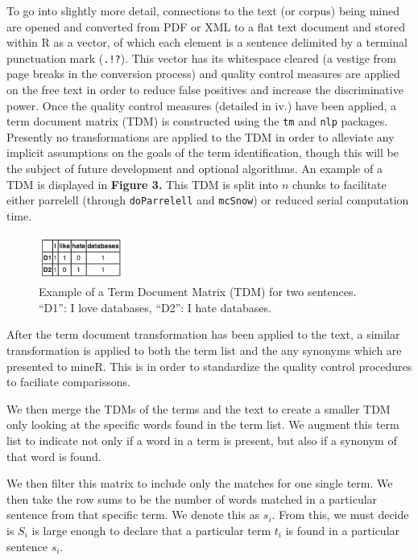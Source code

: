 \documentclass[twoside]{article}
\begin{document}
To go into slightly more detail, connections to the text (or corpus) being mined are opened and converted from PDF or XML to a flat text document and stored within R as a vector, of which each element is a sentence delimited by a terminal punctuation mark (\texttt{.!?}).  This vector has its whitespace cleared (a vestige from page breaks in the conversion process) and quality control measures are applied on the free text in order to reduce false positives and increase the discriminative power. Once the quality control measures (detailed in iv.) have been applied, a term document matrix (TDM) is constructed using the \texttt{tm} and \texttt{nlp} packages. Presently no transformations are applied to the TDM in order to alleviate any implicit assumptions on the goals of the term identification, though this will be the subject of future development and optional algorithms. An example of a TDM is displayed in \textbf{Figure 3.} This TDM is split into $n$ chunks to facilitate either parrelell (through \texttt{doParrelell} and \texttt{mcSnow}) or reduced serial computation time. 

\begin{figure}[h]
\centering
\includegraphics[width=0.25\textwidth]{fig4.png}
\caption{Example of a Term Document Matrix (TDM) for two sentences. ``D1'': I love databases, ``D2'': I hate databases.}
\end{figure}

After the term document transformation has been applied to the text, a similar transformation is applied to both the term list and the any synonyms which are presented to mineR. This is in order to standardize the quality control procedures to faciliate comparissons. 

We then merge the TDMs of the terms and the text to create a smaller TDM only looking at the specific words found in the term list. We augment this term list to indicate not only if a word in a term is present, but also if a synonym of that word is found. 

We then filter this matrix to include only the matches for one single term. We then take the row sums to be the number of words matched in a particular sentence from that specific term. We denote this as $s_i$.  From this, we must decide is $S_i$ is large enough to declare that a particular term $t_i$ is found in a particular sentence $s_i$.
\end{document}
